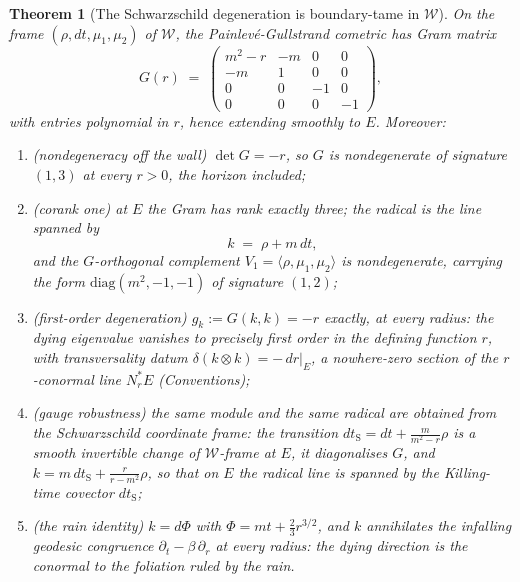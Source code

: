 \documentclass[11pt]{article}
\newtheorem{theorem}{Theorem}[section]
\theoremstyle{definition}
\newcommand{\shW}{\mathcal{W}}
\newcommand{\dtS}{dt_{\mathrm{S}}}
\newcommand{\dtPG}{dt}
\begin{document}
\begin{theorem}[The Schwarzschild degeneration is boundary-tame in $\shW$]\label{thm:schwtame}
On the frame $(\rho, \dtPG, \mu_1, \mu_2)$ of $\shW$, the Painlev\'e-Gullstrand cometric has Gram matrix
\[
G(r) \;=\;
\begin{pmatrix}
m^2 - r & -m & 0 & 0\\
-m & 1 & 0 & 0\\
0 & 0 & -1 & 0\\
0 & 0 & 0 & -1
\end{pmatrix},
\]
with entries polynomial in $r$, hence extending smoothly to $E$. Moreover:
\begin{enumerate}
\item (nondegeneracy off the wall) $\det G = -r$, so $G$ is nondegenerate of signature $(1,3)$ at every $r > 0$, the horizon included;
\item (corank one) at $E$ the Gram has rank exactly three; the radical is the line spanned by
\[
k \;=\; \rho + m\,\dtPG ,
\]
and the $G$-orthogonal complement $V_1 = \langle \rho, \mu_1, \mu_2\rangle$ is nondegenerate, carrying the form $\mathrm{diag}(m^2, -1, -1)$ of signature $(1,2)$;
\item (first-order degeneration) $g_k := G(k,k) = -r$ \emph{exactly}, at every radius: the dying eigenvalue vanishes to precisely first order in the defining function $r$, with transversality datum $\delta(k \otimes k) = -\,dr|_E$, a nowhere-zero section of the $r$-conormal line $N^*_rE$ (Conventions);
\item (gauge robustness) the same module and the same radical are obtained from the Schwarzschild coordinate frame: the transition $\dtS = \dtPG + \tfrac{m}{m^2 - r}\rho$ is a smooth invertible change of $\shW$-frame at $E$, it diagonalises $G$, and $k = m\,\dtS + \tfrac{r}{r - m^2}\rho$, so that on $E$ the radical line is spanned by the Killing-time covector $\dtS$;
\item (the rain identity) $k = d\Phi$ with $\Phi = m t + \tfrac23 r^{3/2}$, and $k$ annihilates the infalling geodesic congruence $\partial_t - \beta\,\partial_r$ at \emph{every} radius: the dying direction is the conormal to the foliation ruled by the rain.
\end{enumerate}
\end{theorem}
\end{document}
